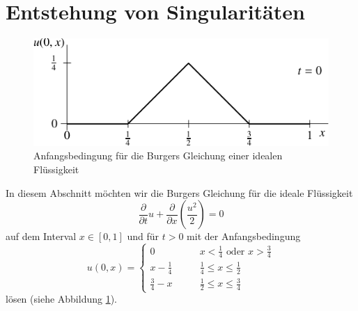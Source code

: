 \section{Entstehung von Singularitäten\label{burgersunstetig}}
\begin{figure}
\begin{center}
\includegraphics[width=0.8\hsize]{../common/images/burgers-1}
\end{center}
\caption{Anfangsbedingung für die Burgers Gleichung einer idealen
Flüssigkeit\label{burgersanfang}}
\end{figure}
In diesem Abschnitt möchten wir die Burgers Gleichung für die ideale
Flüssigkeit
\[
\frac{\partial}{\partial t}u+\frac{\partial}{\partial x}\left(\frac{u^2}2\right)=0
\]
auf dem Interval $x\in[0,1]$ und für $t>0$
mit der Anfangsbedingung
\[
u(0,x)=\begin{cases}
0\qquad&\text{$x<\frac14$ oder $x>\frac34$}\\
x-\frac14\qquad&\frac14\le x\le \frac12\\
\frac34-x\qquad&\frac12\le x\le \frac34
\end{cases}
\]
lösen (siehe Abbildung \ref{burgersanfang}).

